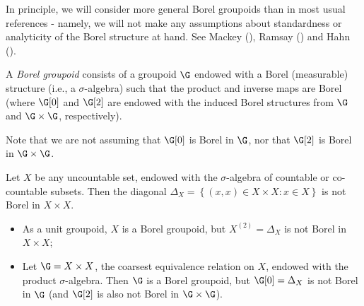 %

%

In principle, we will consider more general Borel groupoids than in most usual references - namely, we will not make any assumptions about standardness or analyticity of the Borel structure at hand. See Mackey (\cite{MR0165034,MR0201562}), Ramsay (\cite{MR0281876}) and Hahn (\cite{MR496796,MR496797}).

\begin{definition}
A \emph{Borel groupoid} consists of a groupoid $\G$ endowed with a Borel (measurable) structure (i.e., a $\sigma$-algebra) such that the product and inverse maps are Borel (where $\G[0]$ and $\G[2]$ are endowed with the induced Borel structures from $\G$ and $\G\times\G$, respectively).
\end{definition}

Note that we are not assuming that $\G[0]$ is Borel in $\G$, nor that $\G[2]$ is Borel in $\G\times\G$. 

\begin{example}
Let $X$ be any uncountable set, endowed with the $\sigma$-algebra of countable or co-countable subsets. Then the diagonal $\Delta_X=\left\{(x,x)\in X\times X:x\in X\right\}$ is not Borel in $X\times X$.
\begin{itemize}
\item As a unit groupoid, $X$ is a Borel groupoid, but $X^{(2)}=\Delta_X$ is not Borel in $X\times X$;
\item Let $\G=X\times X$, the coarsest equivalence relation on $X$, endowed with the product $\sigma$-algebra. Then $\G$ is a Borel groupoid, but $\G[0]=\Delta_X$ is not Borel in $\G$ (and $\G[2]$ is also not Borel in $\G\times\G$).
\end{itemize}
\end{example}

